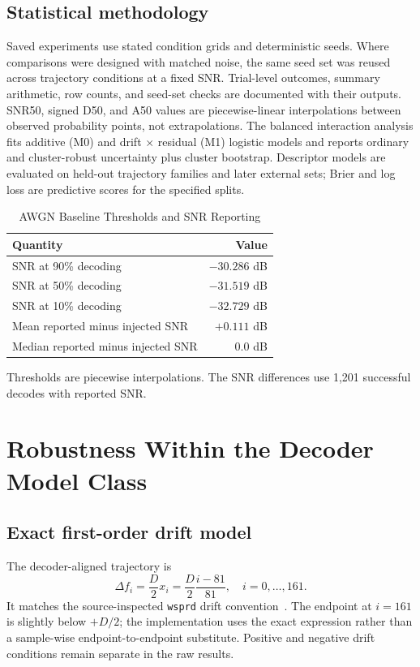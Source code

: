 \documentclass[conference]{IEEEtran}
\begin{document}
\subsection{Statistical methodology}
Saved experiments use stated condition grids and deterministic seeds. Where comparisons were designed with matched noise, the same seed set was reused across trajectory conditions at a fixed SNR. Trial-level outcomes, summary arithmetic, row counts, and seed-set checks are documented with their outputs. SNR50, signed D50, and A50 values are piecewise-linear interpolations between observed probability points, not extrapolations. The balanced interaction analysis fits additive (M0) and drift $\times$ residual (M1) logistic models and reports ordinary and cluster-robust uncertainty plus cluster bootstrap. Descriptor models are evaluated on held-out trajectory families and later external sets; Brier and log loss are predictive scores for the specified splits.

\begin{table}[t]
\caption{AWGN Baseline Thresholds and SNR Reporting}
\label{tab:awgn}
\centering\footnotesize
\begin{tabular}{lr}
\toprule
Quantity & Value \\
\midrule
SNR at 90\% decoding & $-30.286$ dB \\
SNR at 50\% decoding & $-31.519$ dB \\
SNR at 10\% decoding & $-32.729$ dB \\
Mean reported minus injected SNR & $+0.111$ dB \\
Median reported minus injected SNR & $0.0$ dB \\
\bottomrule
\end{tabular}
\vspace{2pt}
\parbox{\columnwidth}{\footnotesize Thresholds are piecewise interpolations. The SNR differences use 1,201 successful decodes with reported SNR.}
\end{table}

\section{Robustness Within the Decoder Model Class}
\subsection{Exact first-order drift model}
The decoder-aligned trajectory is
\begin{equation}
\Delta f_i=\frac{D}{2}x_i=\frac{D}{2}\frac{i-81}{81},\quad i=0,\ldots,161.
\label{eq:linear}
\end{equation}
It matches the source-inspected \texttt{wsprd} drift convention~\cite{wsjtx302}. The endpoint at $i=161$ is slightly below $+D/2$; the implementation uses the exact expression rather than a sample-wise endpoint-to-endpoint substitute. Positive and negative drift conditions remain separate in the raw results.
\end{document}
